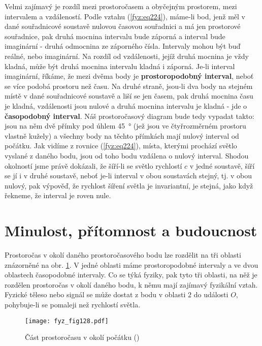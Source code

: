     Velmi zajímavý je rozdíl mezi prostoročasem a obyčejným prostorem, mezi intervalem a 
    vzdáleností. Podle vztahu (\ref{fyz:eq224}), máme-li bod, jenž měl v dané souřadnicové soustavě 
    nulovou časovou souřadnici a má jen prostorové souřadnice, pak druhá mocnina intervalu bude 
    záporná a interval bude imaginární - druhá odmocnina ze záporného čísla. Intervaly mohou být 
    buď reálné, nebo imaginární. Na rozdíl od vzdálenosti, jejíž druhá mocnina je vždy kladná, může 
    být druhá mocnina intervalu kladná i záporná. Je-li interval imaginární, říkáme, že mezi dvěma 
    body je \textbf{prostoropodobný interval}, neboť se více podobá prostoru než času. Na druhé 
    straně, jsou-li dva body na stejném místě v dané souřadnicové soustavě a liší se jen časem, pak 
    druhá mocnina času je kladná, vzdálenosti jsou nulové a druhá mocnina intervalu je kladná - jde 
    o \textbf{časopodobný interval}. Náš prostoročasový diagram bude tedy vypadat takto: jsou na 
    něm dvě přímky pod úhlem \SI{45}{\degree} (jež jsou ve čtyřrozměrném prostoru vlastně kužely) a 
    všechny body na těchto přímkách mají nulový interval od počátku. Jak vidíme z rovnice 
    (\ref{fyz:eq224}), místa, kterými prochází světlo vyslané z daného bodu, jsou od toho bodu 
    vzdálena o nulový interval. Shodou okolností jsme právě dokázali, že šíří-li se světlo 
    rychlostí \(c\) v jedné soustavě, šíří se jí i v druhé soustavě, neboť je-li interval v obou 
    soustavách stejný, tj. v obou nulový, pak výpověď, že rychlost šíření světla je invariantní, je 
    stejná, jako když řekneme, že interval je roven nule.
    
  \section{Minulost, přítomnost a budoucnost}\label{fyz:IchapXVIIsecIII}
    Prostoročas v okolí daného prostoročasového bodu lze rozdělit na tři oblasti znázorněné na obr. 
    \ref{fyz:fig128}. V jedné oblasti máme prostoropodobné intervaly a ve dvou oblastech 
    časopodobné intervaly. Co se týká fyziky, pak tyto tři oblasti, na něž je rozdělen prostoročas 
    v okolí daného bodu, k němu mají zajímavý fyzikální vztah. Fyzické těleso nebo signál se může 
    dostat z bodu v oblasti \(2\) do události \(O\), pohybuje-li se pomaleji než rychlostí světla.

    \begin{figure}[ht!] %
      \centering
      \texttt{[image: fyz\_fig128.pdf]}
      \caption{Část prostoročasu v okolí počátku
               (\cite[s.~241]{Feynman01})}
      \label{fyz:fig128}
    \end{figure}
    
